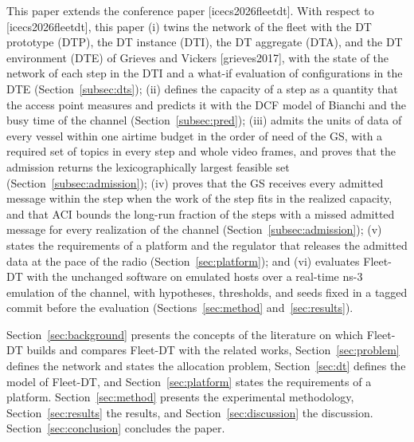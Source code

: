 This paper extends the conference paper [icecs2026fleetdt]. With respect to [icecs2026fleetdt], this paper
(i) twins the network of the fleet with the DT prototype (DTP), the DT instance (DTI), the DT aggregate (DTA), and the DT environment (DTE) of Grieves and Vickers [grieves2017], with the state of the network of each step in the DTI and a what-if evaluation of configurations in the DTE (Section~\ref{subsec:dts});
(ii) defines the capacity of a step as a quantity that the access point measures and predicts it with the DCF model of Bianchi and the busy time of the channel (Section~\ref{subsec:pred});
(iii) admits the units of data of every vessel within one airtime budget in the order of need of the GS, with a required set of topics in every step and whole video frames, and proves that the admission returns the lexicographically largest feasible set (Section~\ref{subsec:admission});
(iv) proves that the GS receives every admitted message within the step when the work of the step fits in the realized capacity, and that ACI bounds the long-run fraction of the steps with a missed admitted message for every realization of the channel (Section~\ref{subsec:admission});
(v) states the requirements of a platform and the regulator that releases the admitted data at the pace of the radio (Section~\ref{sec:platform}); and
(vi) evaluates Fleet-DT with the unchanged software on emulated hosts over a real-time ns-3 emulation of the channel, with hypotheses, thresholds, and seeds fixed in a tagged commit before the evaluation (Sections~\ref{sec:method} and~\ref{sec:results}).

Section~\ref{sec:background} presents the concepts of the literature on which Fleet-DT builds and compares Fleet-DT with the related works, Section~\ref{sec:problem} defines the network and states the allocation problem, Section~\ref{sec:dt} defines the model of Fleet-DT, and Section~\ref{sec:platform} states the requirements of a platform. Section~\ref{sec:method} presents the experimental methodology, Section~\ref{sec:results} the results, and Section~\ref{sec:discussion} the discussion. Section~\ref{sec:conclusion} concludes the paper.
